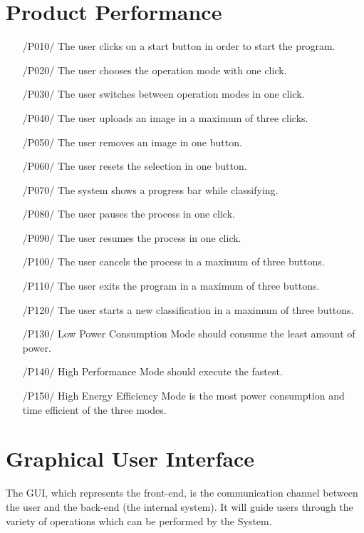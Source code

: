 \documentclass[parskip=full]{scrartcl}
\begin{document}
\pagebreak





\section{Product Performance}

\begin{itemize}
	\item[/P010/] The user clicks on a start button in order to start the program.
	\item[/P020/] The user chooses the operation mode with one click.
	\item[/P030/] The user switches between operation modes in one click.
	\item[/P040/] The user uploads an image in a maximum of three clicks.
	\item[/P050/] The user removes an image in one button.
	\item[/P060/] The user resets the selection in one button.
	\item[/P070/] The system shows a progress bar while classifying.
	\item[/P080/] The user pauses the process in one click.
	\item[/P090/] The user resumes the process in one click.
	\item[/P100/] The user cancels the process in a maximum of three buttons.
	\item[/P110/] The user exits the program in a maximum of three buttons.
	\item[/P120/] The user starts a new classification in a maximum of three buttons.
	\item[/P130/] Low Power Consumption Mode should consume the least amount of power.
	\item[/P140/] High Performance Mode should execute the fastest.
	\item[/P150/] High Energy Efficiency Mode is the most power consumption and time efficient of the three modes.
\end{itemize}

\pagebreak






\section {Graphical User Interface}

The GUI, which represents the front-end, is the communication channel between the user and the back-end (the internal system). It will guide users through the variety of operations which can be performed by the System.
\end{document}
